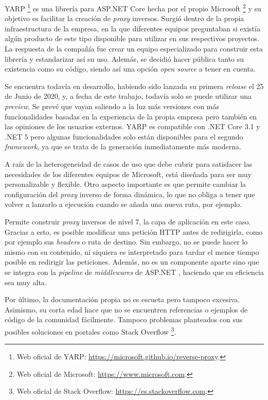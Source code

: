 \documentclass[11pt,spanish,listoffigures]{tfgetsinf}
\begin{document}
YARP \footnote{Web oficial de YARP: \url{https://microsoft.github.io/reverse-proxy}.} es una librería para ASP.NET Core hecha por el propio Microsoft \footnote{Web oficial de Microsoft: \url{https://www.microsoft.com}.} y su objetivo es facilitar la creación de \emph{proxy} inversos. Surgió dentro de la propia infraestructura de la empresa, en la que diferentes equipos preguntaban si existía algún producto de este tipo disponible para utilizar en sus respectivos proyectos. La respuesta de la compañía fue crear un equipo especializado para construir esta librería y estandarizar así su uso. Además, se decidió hacer pública tanto su existencia como su código, siendo así una opción \emph{open source} a tener en cuenta.

Se encuentra todavía en desarrollo, habiendo sido lanzada su primera \emph{release} el 25 de Junio de 2020, y, a fecha de este trabajo, todavía solo se puede utilizar una \emph{preview}. Se prevé que vayan saliendo a la luz más versiones con más funcionalidades basadas en la experiencia de la propia empresa pero también en las opiniones de los usuarios externos. YARP es compatible con .NET Core 3.1 y .NET 5 pero algunas funcionalidades solo están disponibles para el segundo \emph{framework}, ya que se trata de la generación inmediatamente más moderna.

A raíz de la heterogeneidad de casos de uso que debe cubrir para satisfacer las necesidades de los diferentes equipos de Microsoft, está diseñada para ser muy personalizable y flexible. Otro aspecto importante es que permite cambiar la configuración del \emph{proxy} inverso de forma dinámica, lo que no obliga a tener que volver a lanzarlo a ejecución cuando se añada una nueva ruta, por ejemplo.

Permite construir \emph{proxy} inversos de nivel 7, la capa de aplicación en este caso. Gracias a esto, es posible modificar una petición HTTP antes de redirigirla, como por ejemplo sus \emph{headers} o ruta de destino. Sin embargo, no se puede hacer lo mismo con su contenido, ni siquiera es interpretado para tardar el menor tiempo posible en redirigir las peticiones. Además, no es un componente aparte sino que se integra con la \emph{pipeline} de \emph{middlewares} de ASP.NET \cite{MiddlewaresPipeline}, haciendo que su eficiencia sea muy alta.

Por último, la documentación propia no es escueta pero tampoco excesiva. Asimismo, su corta edad hace que no se encuentren referencias o ejemplos de código de la comunidad fácilmente. Tampoco problemas planteados con sus posibles soluciones en portales como Stack Overflow \footnote{Web oficial de Stack Overflow: \url{https://es.stackoverflow.com}.}.
\end{document}
